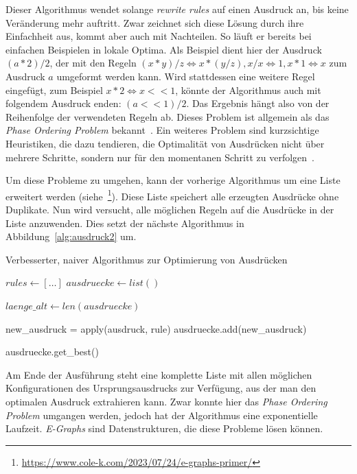 Dieser Algorithmus wendet solange \textit{rewrite rules} auf einen Ausdruck an, bis keine Veränderung mehr auftritt.
Zwar zeichnet sich diese Lösung durch ihre Einfachheit aus, kommt aber auch mit Nachteilen.
So läuft er bereits bei einfachen Beispielen in lokale Optima. 
Als Beispiel dient hier der Ausdruck $(a * 2) / 2$, der mit den Regeln $(x * y) / z \Leftrightarrow x * (y / z), x / x \Leftrightarrow 1, x * 1 \Leftrightarrow x$ 
zum Ausdruck $a$ umgeformt werden kann.
Wird stattdessen eine weitere Regel eingefügt, zum Beispiel $x * 2 \Leftrightarrow x << 1$, könnte der Algorithmus auch mit folgendem Ausdruck enden: $(a << 1) / 2$.
Das Ergebnis hängt also von der Reihenfolge der verwendeten Regeln ab. Dieses Problem ist allgemein als das \textit{Phase Ordering Problem} bekannt~\cite{phaseorder-2009}.
Ein weiteres Problem sind kurzsichtige Heuristiken, die dazu tendieren, die Optimalität von Ausdrücken nicht über mehrere Schritte, sondern nur für den momentanen Schritt
zu verfolgen~\cite{phaseorder-2009}.

\noindent Um diese Probleme zu umgehen, kann der vorherige Algorithmus um eine Liste erweitert werden (siehe~\footnote{\hspace{1.5mm}\url{https://www.cole-k.com/2023/07/24/e-graphs-primer/}}).
Diese Liste speichert alle erzeugten Ausdrücke ohne Duplikate. Nun wird versucht, alle möglichen Regeln auf die Ausdrücke in der Liste anzuwenden. 
Dies setzt der nächste Algorithmus in Abbildung~\ref{alg:ausdruck2} um.

\begin{algorithm}[H]
  \caption{Verbesserter, naiver Algorithmus zur Optimierung von Ausdrücken}\label{alg:ausdruck2}
  \begin{algorithmic}
    \State $rules \gets [\ldots]$
    \State $ausdruecke \gets list()$
    
      \State $laenge\_alt \gets len(ausdruecke)$

          \State new\_ausdruck = apply(ausdruck, rule)
          \State ausdruecke.add(new\_ausdruck)
          \EndIf
        \EndFor
      \EndFor
    \EndWhile

    \State \Return ausdruecke.get\_best()
    \EndFunction
  \end{algorithmic}
\end{algorithm}

Am Ende der Ausführung steht eine komplette Liste mit allen möglichen Konfigurationen des Ursprungsausdrucks zur Verfügung, aus der man den optimalen Ausdruck extrahieren kann.
Zwar konnte hier das \textit{Phase Ordering Problem} umgangen werden, jedoch hat der Algorithmus eine exponentielle Laufzeit.
\textit{E-Graphs} sind Datenstrukturen, die diese Probleme lösen können.

